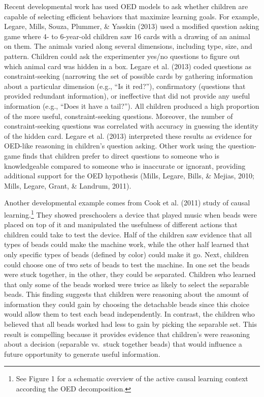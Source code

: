 \documentclass[oneside]{report}
\begin{document}
Recent developmental work has used OED models to ask whether children
are capable of selecting efficient behaviors that maximize learning
goals. For example, Legare, Mills, Souza, Plummer, \& Yasskin (2013)
used a modified question asking game where 4- to 6-year-old children saw
16 cards with a drawing of an animal on them. The animals varied along
several dimensions, including type, size, and pattern. Children could
ask the experimenter yes/no questions to figure out which animal card
was hidden in a box. Legare et al. (2013) coded questions as
constraint-seeking (narrowing the set of possible cards by gathering
information about a particular dimension (e.g., ``Is it red?''),
confirmatory (questions that provided redundant information), or
ineffective that did not provide any useful information (e.g., ``Does it
have a tail?''). All children produced a high proportion of the more
useful, constraint-seeking questions. Moreover, the number of
constraint-seeking questions was correlated with accuracy in guessing
the identity of the hidden card. Legare et al. (2013) interpreted these
results as evidence for OED-like reasoning in children's question
asking. Other work using the question-game finds that children prefer to
direct questions to someone who is knowledgeable compared to someone who
is inaccurate or ignorant, providing additional support for the OED
hypothesis (Mills, Legare, Bills, \& Mejias, 2010; Mills, Legare, Grant,
\& Landrum, 2011).

Another developmental example comes from Cook et al. (2011) study of
causal learning.\footnote{See Figure 1 for a schematic overview of the
  active causal learning context according the OED decomposition.} They
showed preschoolers a device that played music when beads were placed on
top of it and manipulated the usefulness of different actions that
children could take to test the device. Half of the children saw
evidence that all types of beads could make the machine work, while the
other half learned that only specific types of beads (defined by color)
could make it go. Next, children could choose one of two sets of beads
to test the machine. In one set the beads were stuck together, in the
other, they could be separated. Children who learned that only some of
the beads worked were twice as likely to select the separable beads.
This finding suggests that children were reasoning about the amount of
information they could gain by choosing the detachable beads since this
choice would allow them to test each bead independently. In contrast,
the children who believed that all beads worked had less to gain by
picking the separable set. This result is compelling because it provides
evidence that children's were reasoning about a decision (separable
vs.~stuck together beads) that would influence a future opportunity to
generate useful information.
\end{document}
